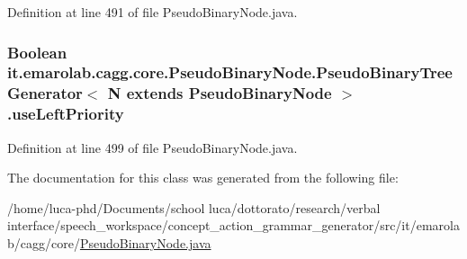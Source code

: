 Definition at line 491 of file Pseudo\-Binary\-Node.\-java.

\hypertarget{classit_1_1emarolab_1_1cagg_1_1core_1_1PseudoBinaryNode_1_1PseudoBinaryTreeGenerator_3_01N_01extends_01PseudoBinaryNode_01_4_a011b9db819d6a595cb4cabe9a7968198}{
\subsubsection[{use\-Left\-Priority}]{\setlength{\rightskip}{0pt plus 5cm}Boolean it.\-emarolab.\-cagg.\-core.\-Pseudo\-Binary\-Node.\-Pseudo\-Binary\-Tree\-Generator$<$ N extends {\bf Pseudo\-Binary\-Node} $>$.use\-Left\-Priority\hspace{0.3cm}{\ttfamily [private]}}}\label{classit_1_1emarolab_1_1cagg_1_1core_1_1PseudoBinaryNode_1_1PseudoBinaryTreeGenerator_3_01N_01extends_01PseudoBinaryNode_01_4_a011b9db819d6a595cb4cabe9a7968198}


Definition at line 499 of file Pseudo\-Binary\-Node.\-java.



The documentation for this class was generated from the following file\-:\begin{DoxyCompactItemize}
\item 
/home/luca-\/phd/\-Documents/school luca/dottorato/research/verbal interface/speech\-\_\-workspace/concept\-\_\-action\-\_\-grammar\-\_\-generator/src/it/emarolab/cagg/core/\hyperlink{PseudoBinaryNode_8java}{Pseudo\-Binary\-Node.\-java}\end{DoxyCompactItemize}
